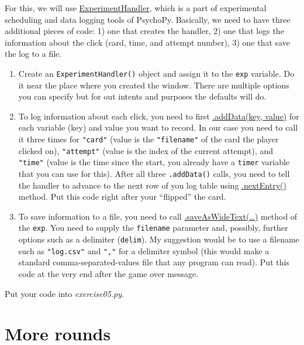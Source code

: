 \documentclass[
]{book}
\providecommand{\tightlist}{%
  \setlength{\itemsep}{0pt}\setlength{\parskip}{0pt}}
\begin{document}
For this, we will use \href{https://psychopy.org/api/data.html\#experimenthandler}{ExperimentHandler}, which is a part of experimental scheduling and data logging tools of PsychoPy. Basically, we need to have three additional pieces of code: 1) one that creates the handler, 2) one that logs the information about the click (card, time, and attempt number), 3) one that save the log to a file.

\begin{enumerate}
\def\labelenumi{\arabic{enumi}.}
\tightlist
\item
  Create an \texttt{ExperimentHandler()} object and assign it to the \texttt{exp} variable. Do it near the place where you created the window. There are multiple options you can specify but for out intents and purposes the defaults will do.
\item
  To log information about each click, you need to first \href{https://psychopy.org/api/data.html\#psychopy.data.TrialHandler.addData}{.addData(key, value)} for each variable (key) and value you want to record. In our case you need to call it three times for \texttt{"card"} (value is the \texttt{"filename"} of the card the player clicked on), \texttt{"attempt"} (value is the index of the current attempt), and \texttt{"time"} (value is the time since the start, you already have a \texttt{timer} variable that you can use for this). After all three \texttt{.addData()} calls, you need to tell the handler to advance to the next row of you log table using \href{https://psychopy.org/api/data.html\#psychopy.data.ExperimentHandler.nextEntry}{.nextEntry()} method. Put this code right after your ``flipped'' the card.
\item
  To save information to a file, you need to call \href{https://psychopy.org/api/data.html\#psychopy.data.ExperimentHandler.saveAsWideText}{.saveAsWideText(\ldots)} method of the \texttt{exp}. You need to supply the \texttt{filename} parameter and, possibly, further options such as a delimiter (\texttt{delim}). My suggestion would be to use a filename such as \texttt{"log.csv"} and \texttt{","} for a delimiter symbol (this would make a standard comma-separated-values file that any program can read). Put this code at the very end after the game over message.
\end{enumerate}

Put your code into \emph{exercise05.py}.

\hypertarget{more-rounds}{%
\section{More rounds}\label{more-rounds}}
\end{document}
